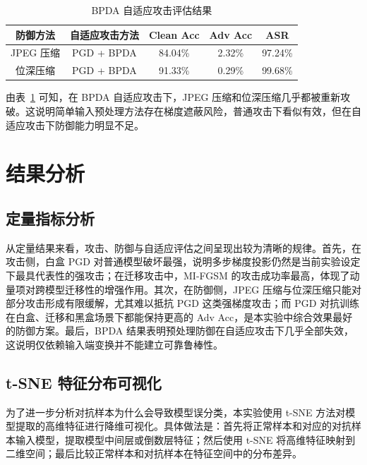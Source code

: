 \documentclass[UTF8,a4paper,12pt]{ctexart}
\begin{document}
\begin{table}[H]
    \centering
    \caption{BPDA 自适应攻击评估结果}
    \begin{tabular}{ccccc}
        \toprule
        防御方法 & 自适应攻击方法 & Clean Acc & Adv Acc & ASR \\
        \midrule
        JPEG 压缩 & PGD + BPDA & 84.04\% & 2.32\% & 97.24\% \\
        位深压缩 & PGD + BPDA & 91.33\% & 0.29\% & 99.68\% \\
        \bottomrule
    \end{tabular}
    \label{tab:bpda}
\end{table}

由表~\ref{tab:bpda} 可知，在 BPDA 自适应攻击下，JPEG 压缩和位深压缩几乎都被重新攻破。这说明简单输入预处理方法存在梯度遮蔽风险，普通攻击下看似有效，但在自适应攻击下防御能力明显不足。

\section{结果分析}
\subsection{定量指标分析}

从定量结果来看，攻击、防御与自适应评估之间呈现出较为清晰的规律。首先，在攻击侧，白盒 PGD 对普通模型破坏最强，说明多步梯度投影仍然是当前实验设定下最具代表性的强攻击；在迁移攻击中，MI-FGSM 的攻击成功率最高，体现了动量项对跨模型迁移性的增强作用。其次，在防御侧，JPEG 压缩与位深压缩只能对部分攻击形成有限缓解，尤其难以抵抗 PGD 这类强梯度攻击；而 PGD 对抗训练在白盒、迁移和黑盒场景下都能保持更高的 Adv Acc，是本实验中综合效果最好的防御方案。最后，BPDA 结果表明预处理防御在自适应攻击下几乎全部失效，这说明仅依赖输入端变换并不能建立可靠鲁棒性。

\subsection{t-SNE 特征分布可视化}

为了进一步分析对抗样本为什么会导致模型误分类，本实验使用 t-SNE 方法对模型提取的高维特征进行降维可视化。具体做法是：首先将正常样本和对应的对抗样本输入模型，提取模型中间层或倒数层特征；然后使用 t-SNE 将高维特征映射到二维空间；最后比较正常样本和对抗样本在特征空间中的分布差异。
\end{document}
